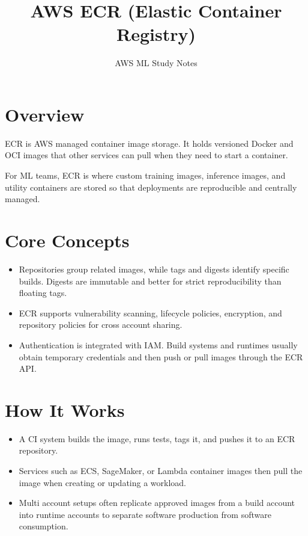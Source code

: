 \documentclass[10pt,twocolumn]{article}
\begin{document}
\title{\vspace{-1.6cm}AWS ECR (Elastic Container Registry)}
\author{AWS ML Study Notes}
\date{}
\maketitle
\small

\section*{Overview}
ECR is AWS managed container image storage. It holds versioned Docker and OCI images that other services can pull when they need to start a container.

For ML teams, ECR is where custom training images, inference images, and utility containers are stored so that deployments are reproducible and centrally managed.

\section*{Core Concepts}
\begin{itemize}
\item Repositories group related images, while tags and digests identify specific builds. Digests are immutable and better for strict reproducibility than floating tags.
\item ECR supports vulnerability scanning, lifecycle policies, encryption, and repository policies for cross account sharing.
\item Authentication is integrated with IAM. Build systems and runtimes usually obtain temporary credentials and then push or pull images through the ECR API.
\end{itemize}

\section*{How It Works}
\begin{itemize}
\item A CI system builds the image, runs tests, tags it, and pushes it to an ECR repository.
\item Services such as ECS, SageMaker, or Lambda container images then pull the image when creating or updating a workload.
\item Multi account setups often replicate approved images from a build account into runtime accounts to separate software production from software consumption.
\end{itemize}
\end{document}
